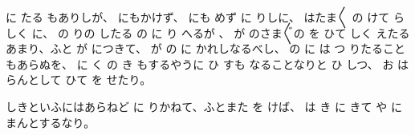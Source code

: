 に
たる
もありしが、
にもかけず、
にも
めず
に
りしに、
はたま〳〵
の
けて
らしく
に、
の
りの
したる
の
に
り
へるが
、
が
のさま〴〵の
を
ひて
しく
えたるあまり、ふと
が
につきて、
が
の
に
かれしなるべし、
の
に
は
つ
りたることもあらぬを、
に
く
の
き
もするやうに
ひ
すも
なることなりと
ひ
しつ、
お
は
らんとして
ひて
を
せたり。

しきといふにはあらねど
に
りかねて、ふとまた
を
けば、
は
き
に
きて
や
に
まんとするなり。

